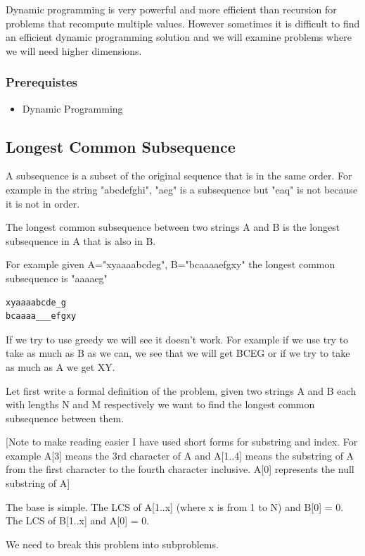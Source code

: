 \documentclass[11pt,oneside]{book}
\begin{document}
Dynamic programming is very powerful and more efficient than recursion for problems that recompute multiple values. However sometimes it is difficult to find an efficient dynamic programming solution and we will examine problems where we will need higher dimensions.

\subsubsection{Prerequistes}

\begin{itemize}
\item Dynamic Programming
\end{itemize}

\subsection{Longest Common Subsequence}

A subsequence is a subset of the original sequence that is in the same order. For example in the string "abcdefghi", "aeg" is a subsequence but "eaq" is not because it is not in order.

The longest common subsequence between two strings A and B is the longest subsequence in A that is also in B.

For example given A="xyaaaabcdeg", B="bcaaaaefgxy" the longest common subsequence is "aaaaeg"

\begin{lstlisting}
xyaaaabcde_g
bcaaaa___efgxy
\end{lstlisting}

If we try to use greedy we will see it doesn't work. For example if we use try to take as much as B as we can, we see that we will get BCEG or if we try to take as much as A we get XY.

Let first write a formal definition of the problem, given two strings A and B each with lengths N and M respectively we want to find the longest common subsequence between them.

[Note to make reading easier I have used short forms for substring and index. For example A[3] means the 3rd character of A and A[1..4] means the substring of A from the first character to the fourth character inclusive. A[0] represents the null substring of A]

The base is simple. The LCS of A[1..x] (where x is from 1 to N) and B[0] = 0. The LCS of B[1..x] and A[0] = 0.

We need to break this problem into subproblems.
\end{document}
